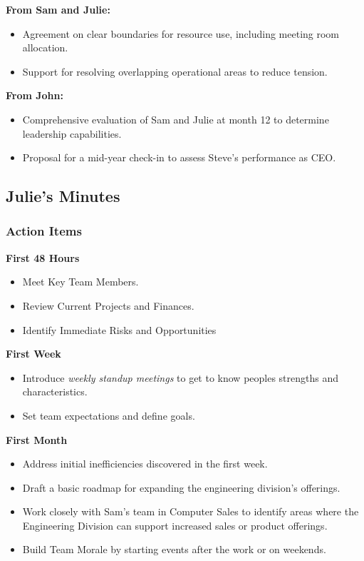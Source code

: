 \documentclass[a4paper,10pt]{article}
\begin{document}
\noindent \textbf{From Sam and Julie:}
\begin{itemize}
    \item Agreement on clear boundaries for resource use, including meeting room allocation.
    \item Support for resolving overlapping operational areas to reduce tension.
\end{itemize}

\noindent \textbf{From John:}
\begin{itemize}
    \item Comprehensive evaluation of Sam and Julie at month 12 to determine leadership capabilities.
    \item Proposal for a mid-year check-in to assess Steve’s performance as CEO.
\end{itemize}

\subsection{Julie's Minutes}
\author{Phileas Barome (John)}

\subsubsection{Action Items}

\noindent \textbf{First 48 Hours}
\begin{itemize}
    \item Meet Key Team Members.
    \item Review Current Projects and Finances.
    \item Identify Immediate Risks and Opportunities
\end{itemize}

\noindent \textbf{First Week}
\begin{itemize}
    \item Introduce \textit{weekly standup meetings} to get to know peoples strengths and characteristics.
    \item Set team expectations and define goals.
\end{itemize}

\noindent \textbf{First Month}
\begin{itemize}
    \item Address initial inefficiencies discovered in the first week.
    \item Draft a basic roadmap for expanding the engineering division’s offerings.
    \item Work closely with Sam’s team in Computer Sales to identify areas where the Engineering Division can support increased sales or product offerings.
    \item Build Team Morale by starting events after the work or on weekends.

\end{itemize}
\end{document}
